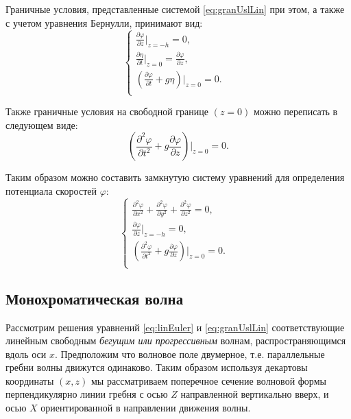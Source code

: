 Граничные условия, представленные системой \eqref{eq:granUslLin} при этом, а также с учетом уравнения Бернулли, принимают вид:
\begin{equation}\label{eq:granUslLin1}
\begin{cases}
    \frac{\partial \varphi}{\partial z}|_{z=-h}=0, &\\
    \frac{\partial \eta}{\partial t}|_{z=0}=\frac{\partial \varphi}{\partial z},&\\
    (\frac{\partial \varphi}{\partial t}+ g\eta)|_{z=0}=0.&\\
\end{cases}
\end{equation}

Также граничные условия на свободной границе $(z=0)$ можно переписать в следующем виде:
\begin{equation}\label{eq:granUslLin2}
    (\frac{\partial^2 \varphi}{\partial t^2}+ g\frac{\partial \varphi}{\partial z})|_{z=0}=0.
\end{equation}

Таким образом можно составить замкнутую систему уравнений для определения потенциала скоростей $\varphi$:
\begin{equation}\label{eq:granUslLin1}
\begin{cases}
    \frac{\partial^2 \varphi}{\partial x^2}+\frac{\partial^2 \varphi}{\partial y^2}+\frac{\partial^2 \varphi}{\partial z^2}=0, &\\
    \frac{\partial \varphi}{\partial z}|_{z=-h}=0, &\\
    (\frac{\partial^2 \varphi}{\partial t^2}+ g\frac{\partial \varphi}{\partial z})|_{z=0}=0. &\\
\end{cases}
\end{equation}

\subsection{Монохроматическая волна}\label{monochromatWave}
Рассмотрим решения уравнений \eqref{eq:linEuler} и \eqref{eq:granUslLin} соответствующие линейным свободным \emph{бегущим или прогрессивным} волнам, распространяющимся вдоль оси $x$. Предположим что волновое поле двумерное, т.е. параллельные гребни волны движутся одинаково. Таким образом используя декартовы координаты $(x,z)$ мы рассматриваем поперечное сечение волновой формы перпендикулярно линии гребня с осью $Z$ направленной вертикально вверх, и осью $X$ ориентированной в направлении движения волны.

